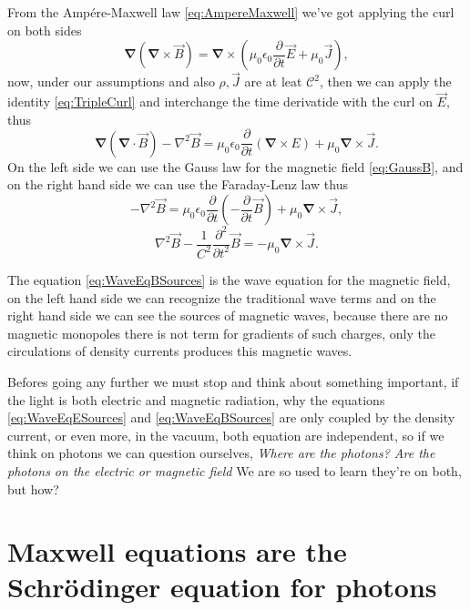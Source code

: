     From the Ampére-Maxwell law \ref{eq:AmpereMaxwell} we've got applying the curl on both sides
    \begin{equation*}
        \bm{\nabla}\left(\bm{\nabla} \times \vec{B} \right) = \bm{\nabla} \times \left( \mu_0\epsilon_0 \frac{\partial}{\partial t}\vec{E} + \mu_0 \vec{J}\right),
    \end{equation*}
    now, under our assumptions and also $\rho, \vec{J}$ are at leat $\mathcal{C}^2$, then we can apply the identity \ref{eq:TripleCurl} and interchange the time derivatide with the curl on $\vec{E}$, thus
    \begin{equation*}
        \bm{\nabla}\left(\bm{\nabla} \cdot \vec{B} \right) -\nabla^2 \vec{B} = \mu_0\epsilon_0 \frac{\partial}{\partial t}\left(\bm{\nabla}\times E\right) + \mu_0 \bm{\nabla}\times \vec{J}.
    \end{equation*}
    On the left side we can use the Gauss law for the magnetic field \ref{eq:GaussB}, and on the right hand side we can use the Faraday-Lenz law thus
    \begin{equation*}
        -\nabla^2 \vec{B} = \mu_0\epsilon_0 \frac{\partial}{\partial t}\left(-\frac{\partial}{\partial t}\vec{B}\right) + \mu_0 \bm{\nabla}\times \vec{J},
    \end{equation*}
    \begin{equation}\label{eq:WaveEqBSources}
        \nabla^2 \vec{B} - \frac{1}{C^2}\frac{\partial^2}{\partial t^2}\vec{B} = - \mu_0 \bm{\nabla}\times \vec{J}.
    \end{equation}

    The equation \ref{eq:WaveEqBSources} is the wave equation for the magnetic field, on the left hand side we can recognize the traditional wave terms and on the right hand side we can see the sources of magnetic waves, because there are no magnetic monopoles there is not term for gradients of such charges, only the circulations of density currents produces this magnetic waves.

    Befores going any further we must stop and think about something important, if the light is both electric and magnetic radiation, why the equations \ref{eq:WaveEqESources} and \ref{eq:WaveEqBSources} are only coupled by the density current, or even more, in the vacuum, both equation are independent, so if we think on photons we can question ourselves, \textit{Where are the photons? Are the photons on the electric or magnetic field} We are so used to learn they're on both, but how?

\section{Maxwell equations are the Schrödinger equation for photons}

